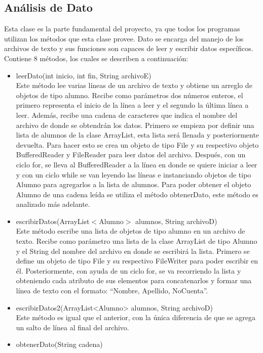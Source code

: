 \documentclass[11pt]{article}
\begin{document}
\subsection{Análisis de Dato}
Esta clase es la parte fundamental del proyecto, ya que todos los programas utilizan los métodos que esta clase provee. Dato se encarga del manejo de los archivos de texto y sus funciones son capaces de leer y escribir datos específicos. Contiene 8 métodos, los cuales se describen a continuación:
\begin{itemize}
\item leerDato(int inicio, int fin, String archivoE)\\
Este método lee varias líneas de un archivo de texto y obtiene un arreglo de objetos de tipo alumno. Recibe como parámetros dos números enteros, el primero representa el inicio de la línea a leer y el segundo la última línea a leer. Además, recibe una cadena de caracteres que indica el nombre del archivo de donde se obtendrán los datos.
Primero se empieza por definir una lista de alumnos de la clase ArrayList, esta lista será llenada y posteriormente devuelta. Para hacer esto se crea un objeto de tipo File y su respectivo objeto BufferedReader y FileReader para leer datos del archivo. Después, con un ciclo for, se lleva al BufferedReader a la línea en donde se quiere iniciar a leer y con un ciclo while se van leyendo las líneas e instanciando objetos de tipo Alumno para agregarlos a la lista de alumnos. Para poder obtener el objeto Alumno de una cadena leída se utiliza el método obtenerDato, este método es analizado más adelante.
\item escribirDatos(ArrayList$<$Alumno$>$ alumnos, String archivoD) \\
Este método escribe una lista de objetos de tipo alumno en un archivo de texto. Recibe como parámetro una lista de la clase ArrayList de tipo Alumno y el String del nombre del archivo en donde se escribirá la lista. 
Primero se define un objeto de tipo File y su respectivo FileWriter para poder escribir en él. Posteriormente, con ayuda de un ciclo for, se va recorriendo la lista y obteniendo cada atributo de sus elementos para concatenarlos y formar una línea de texto con el formato: “Nombre, Apellido, NoCuenta”.
\item escribirDatos2(ArrayList<Alumno> alumnos, String archivoD) \\
Este método es igual que el anterior, con la única diferencia de que se agrega un salto de línea al final del archivo.
\item obtenerDato(String cadena) \\

\end{itemize}
\end{document}
